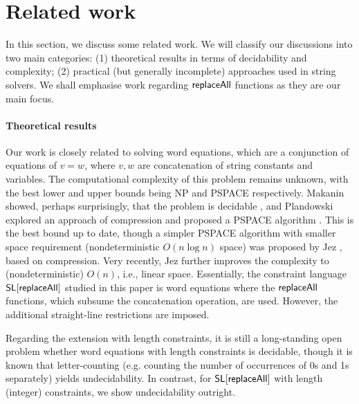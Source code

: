 
\section{Related work}\label{sec-rel}

 
In this section, we discuss some related work. We will classify our discussions into two main categories: (1) theoretical results in terms of decidability and complexity; (2) practical (but generally incomplete) approaches used in string solvers.  We shall emphasise work regarding $\mathsf{replaceAll}$ functions as they are our main focus. 

\paragraph{Theoretical results}
Our work is closely related to solving word equations, which are a conjunction of equations of $v=w$, where $v, w$ are concatenation of string constants and variables. The computational complexity of this problem remains unknown, with the best lower and upper bounds being NP and PSPACE respectively. Makanin %
showed, perhaps surprisingly, that the problem is decidable \cite{Makanin}, and %
Plandowski explored an approach of compression and proposed a PSPACE algorithm \cite{P04}.  This is the best bound up to date, though a simpler PSPACE algorithm with smaller space requirement (nondeterministic $O(n \log n)$ space) was proposed by Jez \cite{J16}, based on compression. Very recently, Jez \cite{J17} further improves the complexity to (nondeterministic) $O(n )$, i.e.,  linear space. 
Essentially, the constraint language  $\mathsf{SL}[\mathsf{replaceAll}]$ studied in this paper is word equations where the $\mathsf{replaceAll}$ functions, which subsume the concatenation operation, are used. However, the additional straight-line restrictions are imposed.  

Regarding the extension with length constraints, it is still a long-standing open problem whether word equations with length constraints is decidable, though it is known that letter-counting (e.g. counting the number of occurrences of 0s and 1s separately) yields undecidability. In contrast, for  $\mathsf{SL}[\mathsf{replaceAll}]$ with length (integer) constraints, we show undecidability outright. 



